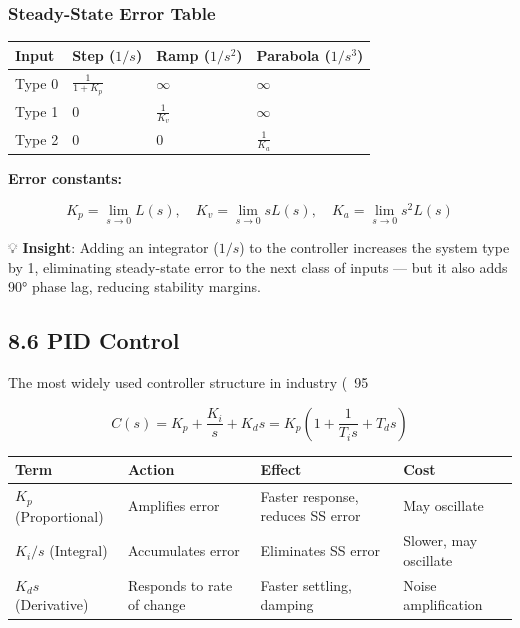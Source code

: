 \documentclass[11pt,a4paper]{book}
\begin{document}
\subsubsection{Steady-State Error Table}

\begin{center}
\begin{tabular}{|l|l|l|l|}
\hline
Input & Step ($1/s$) & Ramp ($1/s^2$) & Parabola ($1/s^3$) \\
\hline
Type 0 & $\frac{1}{1+K_p}$ & $\infty$ & $\infty$ \\
Type 1 & $0$ & $\frac{1}{K_v}$ & $\infty$ \\
Type 2 & $0$ & $0$ & $\frac{1}{K_a}$ \\
\hline
\end{tabular}
\end{center}

\textbf{Error constants:}

\[K_p = \lim_{s \to 0} L(s), \quad K_v = \lim_{s \to 0} sL(s), \quad K_a = \lim_{s \to 0} s^2 L(s)\]

💡 \textbf{Insight}: Adding an integrator ($1/s$) to the controller increases the system type by 1, eliminating steady-state error to the next class of inputs — but it also adds 90° phase lag, reducing stability margins.

\medskip\noindent\hrulefill\medskip

\subsection{8.6 PID Control}

The most widely used controller structure in industry (~95%

\[C(s) = K_p + \frac{K_i}{s} + K_d s = K_p \left(1 + \frac{1}{T_i s} + T_d s\right)\]

\begin{center}
\begin{tabular}{|l|l|l|l|}
\hline
Term & Action & Effect & Cost \\
\hline
$K_p$ (Proportional) & Amplifies error & Faster response, reduces SS error & May oscillate \\
$K_i / s$ (Integral) & Accumulates error & Eliminates SS error & Slower, may oscillate \\
$K_d s$ (Derivative) & Responds to rate of change & Faster settling, damping & Noise amplification \\
\hline
\end{tabular}
\end{center}
\end{document}

